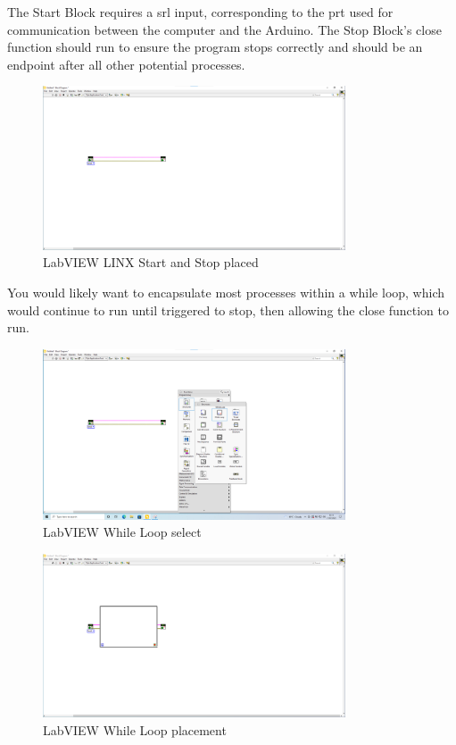 \documentclass[a4paper,11pt]{report}
\begin{document}
The Start Block requires a \gls{srl} input, corresponding to the \gls{prt} used for communication between the computer and the Arduino. The Stop Block's close function should run to ensure the program stops correctly and should be an endpoint after all other potential processes.

\begin{figure}[H]
\centering
\includegraphics[width=0.8\textwidth]{screenshots/labview7}
\caption{LabVIEW LINX Start and Stop placed}
\end{figure}

You would likely want to encapsulate most processes within a while loop, which would continue to run until triggered to stop, then allowing the close function to run.

\begin{figure}[H]
\centering
\includegraphics[width=0.8\textwidth]{screenshots/labview8}
\caption{LabVIEW While Loop select}
\end{figure}

\begin{figure}[H]
\centering
\includegraphics[width=0.8\textwidth]{screenshots/labview9}
\caption{LabVIEW While Loop placement}
\end{figure}
\end{document}
